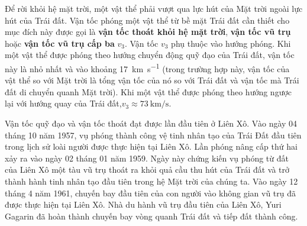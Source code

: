 Để rời khỏi hệ mặt trời, một vật thể phải vượt qua lực hút của Mặt trời ngoài lực hút của Trái đất. Vận tốc phóng một vật thể từ bề mặt Trái đất cần thiết cho mục đích này được gọi là \textbf{vận tốc thoát khỏi hệ mặt trời}, \textbf{vận tốc vũ trụ} hoặc \textbf{vận tốc vũ trụ cấp ba} $v_3$. Vận tốc $v_3$ phụ thuộc vào hướng phóng. Khi một vật thể được phóng theo hướng chuyển động quỹ đạo của Trái đất, vận tốc này là nhỏ nhất và vào khoảng \SI{17}{\kilo\metre\per\second} (trong trường hợp này, vận tốc của vật thể so với Mặt trời là tổng vận tốc của nó so với Trái đất và vận tốc mà Trái đất di chuyển quanh Mặt trời). Khi một vật thể được phóng theo hướng ngược lại với hướng quay của Trái đất,$v_3\approx \SI{73}{\kilo\metre\per\second}$.

Vận tốc quỹ đạo và vận tốc thoát đạt được lần đầu tiên ở Liên Xô. Vào ngày 04 tháng 10 năm 1957, vụ phóng thành công vệ tinh nhân tạo của Trái Đất đầu tiên trong lịch sử loài người được thực hiện tại Liên Xô. Lần phóng nâng cấp thứ hai xảy ra vào ngày 02 tháng 01 năm 1959. Ngày này chứng kiến vụ phóng từ đất của Liên Xô một tàu vũ trụ thoát ra khỏi quả cầu thu hút của Trái đất và trở thành hành tinh nhân tạo đầu tiên trong hệ Mặt trời của chúng ta. Vào ngày 12 tháng 4 năm 1961, chuyến bay đầu tiên của con người vào không gian vũ trụ đã được thực hiện tại Liên Xô. Nhà du hành vũ trụ đầu tiên của Liên Xô, Yuri Gagarin đã hoàn thành chuyến bay vòng quanh Trái đất và tiếp đất thành công.